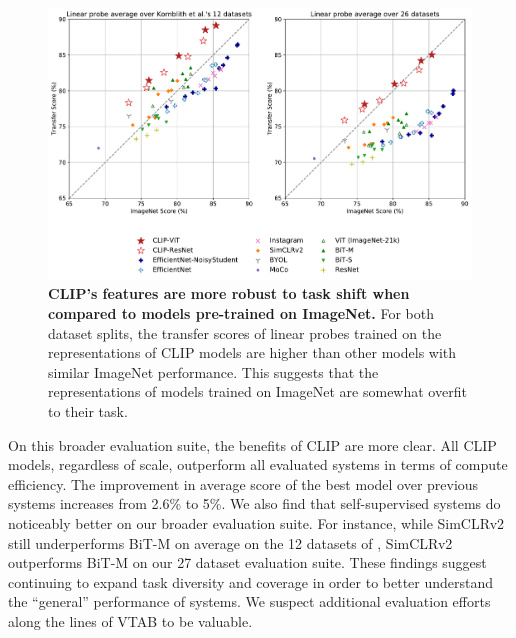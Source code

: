 \documentclass{article}
\begin{document}
\begin{figure}[t]
\includegraphics[width=\textwidth]{linear-probes-transfer.pdf}
\vspace{-2em}
\caption{\textbf{CLIP's features are more robust to task shift when compared to models pre-trained on ImageNet.}
For both dataset splits, the transfer scores of linear probes trained on the representations of CLIP models are higher than other models with similar ImageNet performance. This suggests that the representations of models trained on ImageNet are somewhat overfit to their task. %
}
\label{fig:linear-probe-transfer}
\end{figure}

On this broader evaluation suite, the benefits of CLIP are more clear. All CLIP models, regardless of scale, outperform all evaluated systems in terms of compute efficiency. The improvement in average score of the best model over previous systems increases from 2.6\% to 5\%. We also find that self-supervised systems do noticeably better on our broader evaluation suite. For instance, while SimCLRv2 still underperforms BiT-M on average on the 12 datasets of \citet{kornblith2019better}, SimCLRv2 outperforms BiT-M on our 27 dataset evaluation suite. These findings suggest continuing to expand task diversity and coverage in order to better understand the ``general'' performance of systems. We suspect additional evaluation efforts along the lines of VTAB to be valuable.
\end{document}
